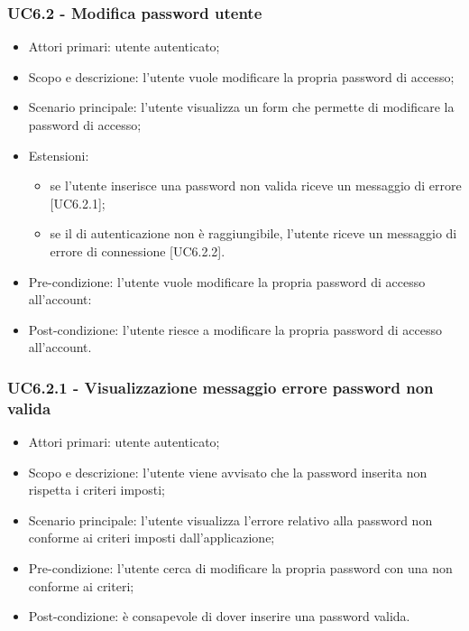 \subsubsection{UC6.2 - Modifica password utente}
\begin{itemize}
	\item  Attori primari: utente autenticato;
	\item  Scopo e descrizione: l'utente vuole modificare la propria password di accesso;
	\item  Scenario principale: l'utente visualizza un form che permette di modificare la password di accesso;
	\item  Estensioni: 
		   \begin{itemize}
		   		\item se l'utente inserisce una password non valida riceve un messaggio di errore [UC6.2.1];
				\item se il  di autenticazione non è raggiungibile, l'utente riceve un messaggio di errore di connessione [UC6.2.2].
		   \end{itemize}
	\item  Pre-condizione: l'utente vuole modificare la propria password di accesso all'account:
	\item  Post-condizione: l'utente riesce a modificare la propria password di accesso all'account.
\end{itemize}
\subsubsection{UC6.2.1 - Visualizzazione messaggio errore password non valida}
\begin{itemize}
	\item  Attori primari: utente autenticato;
	\item  Scopo e descrizione: l'utente viene avvisato che la password inserita non rispetta i criteri imposti;
	\item  Scenario principale: l'utente visualizza l'errore relativo alla password non conforme ai criteri imposti dall'applicazione;
	\item  Pre-condizione: l'utente cerca di modificare la propria password con una non conforme ai criteri;
	\item  Post-condizione: è consapevole di dover inserire una password valida.
\end{itemize}
